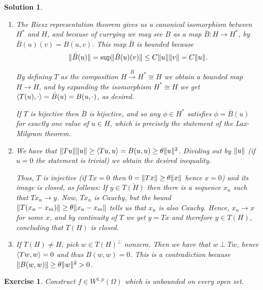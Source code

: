 \documentclass{article}
\newtheorem{ex}{Exercise}
\theoremstyle{nonumberplain}
\newtheorem{sol}{Solution}
\newcommand{\closed}[1]{\overline{#1}}
\DeclarePairedDelimiter{\Norm}{\lVert}{\rVert}
\DeclarePairedDelimiter{\braket}{\langle}{\rangle}
\begin{document}
\begin{sol}
\leavevmode
\begin{enumerate}
\item The Riesz representation theorem gives us a canonical isomorphism between $H^*$ and $H$, and because of currying we may see $B$ as a map $\bar B \colon H \to H^*$, by $\bar B(u)(v) = B(u,v)$. This map $\bar B$ is bounded because
\begin{equation}
\Norm{\bar B(u)} = \sup \Norm{\bar B(u)(v)} \leq C \Norm u \Norm v = C \Norm u.
\end{equation}

By defining $T$ as the composition $H \xrightarrow{\bar B} H^* \cong H$ we obtain a bounded map $H \to H$, and by expanding the isomorphism $H^* \cong H$ we get $\braket{T(u), \cdot} = \bar B(u) = B(u,\cdot)$, as desired.

If $T$ is bijective then $\bar B$ is bijective, and so any $\phi \in H^*$ satisfies $\phi = \bar B(u)$ for exactly one value of $u \in H$, which is precisely the statement of the Lax-Milgram theorem.
\item We have that $\Norm{Tu}\Norm{u} \geq \braket{Tu,u} = B(u,u) \geq \theta \Norm{u}^2$. Dividing out by $\Norm u$ (if $u = 0$ the statement is trivial) we obtain the desired inequality.

Thus, $T$ is injective (if $Tx = 0$ then $0 = \Norm{Tx} \geq \theta \Norm x$ hence $x = 0$) and its image is closed, as follows: If $y \in \closed{T(H)}$ then there is a sequence $x_n$ such that $Tx_n \to y$. Now, $Tx_n$ is Cauchy, but the bound $\Norm{T(x_n - x_m)} \geq \theta \Norm{x_n - x_m}$ tells us that $x_n$ is also Cauchy. Hence, $x_n \to x$ for some $x$, and by continuity of $T$ we get $y = Tx$ and therefore $y \in T(H)$, concluding that $T(H)$ is closed.

\item If $T(H) \neq H$, pick $w \in T(H)^\perp$ nonzero. Then we have that $w \perp Tw$, hence $\braket{Tw,w} = 0$ and thus $B(w,w) = 0$. This is a contradiction because $\Norm{B(w,w)} \geq \theta \Norm{w}^2 > 0$.
\end{enumerate}
\end{sol}

\begin{ex}
Construct $f \in W^{1,p}(\Omega)$ which is unbounded on every open set.
\end{ex}
\end{document}
